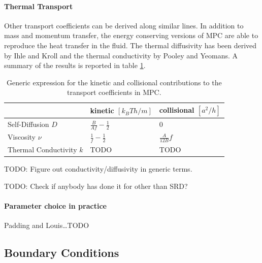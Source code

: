 \documentclass[8.5pt,twoside,twocolumn]{article}
\begin{document}

\paragraph{Thermal Transport}

Other transport coefficients can be derived along similar lines. In addition to mass and momentum transfer, the energy conserving versions of MPC are able to reproduce the heat transfer in the fluid. The thermal diffusivity has been derived by Ihle and Kroll\cite{Ihle} and the thermal conductivity by Pooley and Yeomans\cite{Pooley:2005}. A summary of the results is reported in table \ref{tab:mpc-transport-coefficients}.

\begin{table}\centering
\begin{tabular}{l|l|l}
\hline
  & kinetic $[k_BTh/m]$ & collisional $[a^2/h]$ \\
\hline
Self-Diffusion $D$        & $\frac{B}{A f}-\frac{1}{2}$ & 0 \\
Viscosity $\nu$           & $\frac{1}{f}-\frac{1}{2}$   & $\frac{A}{12B} f$ \\
Thermal Conductivity $k$  & TODO & TODO \\
\hline
\end{tabular}
\caption{Generic expression for the kinetic and collisional contributions to the transport coefficients in MPC.}
\label{tab:mpc-transport-coefficients}
\end{table}

TODO: Figure out conductivity/diffusivity in generic terms.

TODO: Check if anybody has done it for other than SRD?

\paragraph{Parameter choice in practice}

Padding and Louis\dots TODO

\subsection{Boundary Conditions}
\end{document}

